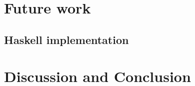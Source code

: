 \section{Future work}

\subsection{Haskell implementation}\label{Haskell implementation}

\section{Discussion and Conclusion}












  
  


